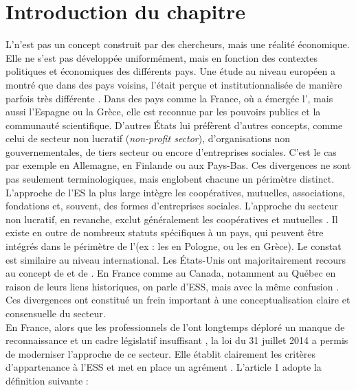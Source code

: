 \section*{Introduction du chapitre}
L'\es n’est pas un concept construit par des chercheurs, mais une réalité économique. Elle ne s’est pas développée uniformément, mais en fonction des contextes politiques et économiques des différents pays. Une étude au niveau européen a montré que dans des pays voisins, l’\es était perçue et institutionnalisée de manière parfois très différente \parencite{monzon_campos2012social}. Dans des pays comme la France, où a émergée l’\es, mais aussi l’Espagne ou la Grèce, elle est reconnue par les pouvoirs publics et la communauté scientifique. D’autres États lui préfèrent d’autres concepts, comme celui de secteur non lucratif (\textit{non-profit sector}), d’organisations non gouvernementales, de tiers secteur ou encore d’entreprises sociales. C’est le cas par exemple en Allemagne, en Finlande ou aux Pays-Bas. Ces divergences ne sont pas seulement terminologiques, mais englobent chacune un périmètre distinct. L’approche de l’ES la plus large intègre les coopératives, mutuelles, associations, fondations et, souvent, des formes d’entreprises sociales. L’approche du secteur non lucratif, en revanche, exclut généralement les coopératives et mutuelles \parencite{laville2000leconomie}. Il existe en outre de nombreux statuts spécifiques à un pays, qui peuvent être intégrés dans le périmètre de l’\es (ex : les  en Pologne, ou les  en Grèce). Le constat est similaire au niveau international. Les États-Unis ont majoritairement recours au concept de  \parencite{hansmann1980role} et de  \parencite{salamon2016beyond}. En France comme au Canada, notamment au Québec en raison de leurs liens historiques, on parle d’ESS, mais avec la même confusion \parencite{levesque1999leconomie}. Ces divergences ont constitué un frein important à une conceptualisation claire et consensuelle du secteur. \\

En France, alors que les professionnels de l’\ess ont longtemps déploré un manque de reconnaissance et un cadre législatif insuffisant \parencite{vercamer2010leconomie}, la loi du 31 juillet 2014 a permis de moderniser l’approche de ce secteur. Elle établit clairement les critères d’appartenance à l’ESS et met en place un agrément \esus. L'article 1 adopte la définition suivante :

